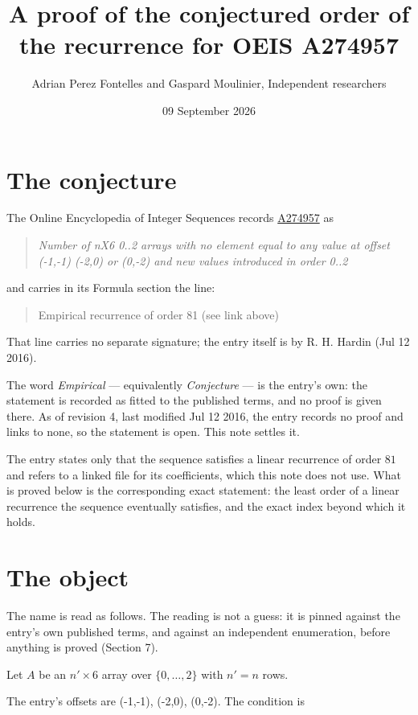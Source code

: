 \documentclass[11pt]{article}
\title{A proof of the conjectured order of the recurrence for OEIS A274957}
\author{Adrian Perez Fontelles and Gaspard Moulinier, Independent researchers}
\date{09 September 2026}
\theoremstyle{definition}
\begin{document}
\maketitle
\section{The conjecture}

The Online Encyclopedia of Integer Sequences records \href{https://oeis.org/A274957}{A274957} as

\begin{quote}\itshape Number of nX6 0..2 arrays with no element equal to any value at offset (-1,-1) (-2,0) or (0,-2) and new values introduced in order 0..2\end{quote}

and carries in its Formula section the line:

\begin{quote}\ttfamily Empirical recurrence of order 81 (see link above)\end{quote}

That line carries no separate signature; the entry itself is by R. H. Hardin (Jul 12 2016).

The word {\itshape Empirical} --- equivalently {\itshape Conjecture} --- is the entry's own: the statement is recorded as fitted to the published terms, and no proof is given there. As of revision 4, last modified Jul 12 2016, the entry records no proof and links to none, so the statement is open. This note settles it.

The entry states only that the sequence satisfies a linear recurrence of order $81$ and refers to a linked file for its coefficients, which this note does not use. What is proved below is the corresponding exact statement: the least order of a linear recurrence the sequence eventually satisfies, and the exact index beyond which it holds.

\section{The object}

The name is read as follows. The reading is not a guess: it is pinned against the entry's own published terms, and against an independent enumeration, before anything is proved (Section 7).

Let $A$ be an $n' \times 6$ array over $\{0,\dots,2\}$ with $n' = n$ rows.

The entry's offsets are (-1,-1), (-2,0), (0,-2). The condition is
\end{document}

